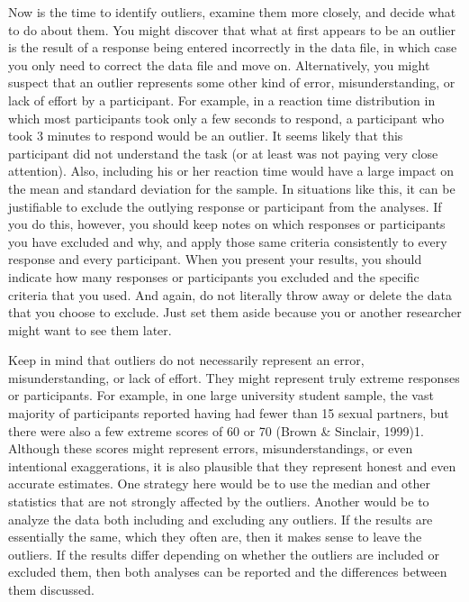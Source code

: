 Now is the time to identify outliers, examine them more closely, and decide what to do about them. You might discover that what at first appears to be an outlier is the result of a response being entered incorrectly in the data file, in which case you only need to correct the data file and move on. Alternatively, you might suspect that an outlier represents some other kind of error, misunderstanding, or lack of effort by a participant. For example, in a reaction time distribution in which most participants took only a few seconds to respond, a participant who took 3 minutes to respond would be an outlier. It seems likely that this participant did not understand the task (or at least was not paying very close attention). Also, including his or her reaction time would have a large impact on the mean and standard deviation for the sample. In situations like this, it can be justifiable to exclude the outlying response or participant from the analyses. If you do this, however, you should keep notes on which responses or participants you have excluded and why, and apply those same criteria consistently to every response and every participant. When you present your results, you should indicate how many responses or participants you excluded and the specific criteria that you used. And again, do not literally throw away or delete the data that you choose to exclude. Just set them aside because you or another researcher might want to see them later.


Keep in mind that outliers do not necessarily represent an error, misunderstanding, or lack of effort. They might represent truly extreme responses or participants. For example, in one large university student sample, the
vast majority of participants reported having had fewer than 15 sexual partners, but there were also a few extreme scores of 60 or 70 (Brown \& Sinclair, 1999)1. Although these scores might represent errors, misunderstandings, or even intentional exaggerations, it is also plausible that they represent honest and even accurate estimates. One strategy here would be to use the median and other statistics that are not strongly affected by the outliers. Another would be to analyze the data both including and excluding any outliers. If the results are essentially the same, which they often are, then it makes sense to leave the outliers. If the results differ depending on whether the outliers are included or excluded them, then both analyses can be reported and the differences between them discussed.



